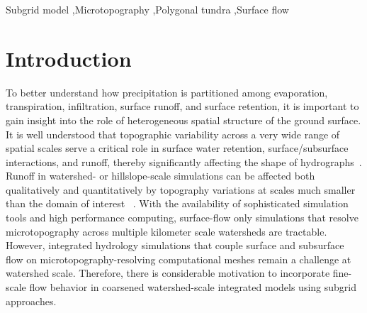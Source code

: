 \documentclass[review,11pt]{elsarticle}
\begin{document}
\begin{frontmatter}
\begin{keyword}
Subgrid model \sep Microtopography  \sep  Polygonal tundra \sep  Surface flow
\end{keyword}

\end{frontmatter}

\linenumbers

\FloatBarrier
\section{Introduction}\label{introduction}
To better understand how precipitation is partitioned among evaporation, transpiration, infiltration, surface runoff, and surface retention, it is important to gain insight into the role of heterogeneous spatial structure of the ground surface.
It is well understood that topographic variability across a very wide range of spatial scales serve a critical role in surface water retention, surface/subsurface interactions, and runoff, thereby significantly affecting the shape of hydrographs~\cite{toth1962theory,dunne1991effects,holden2005peatland, kvaerner2008generation, huang2009influences, andresen2015disappearing}.
Runoff in watershed- or hillslope-scale simulations can be affected both qualitatively and quantitatively by topography variations at scales much smaller than the domain of interest ~\cite{bronstert1997modelling,nakayama2006simulation}.
With the availability of sophisticated simulation tools and high performance computing, surface-flow only simulations that resolve microtopography across multiple kilometer scale watersheds are tractable.
However, integrated hydrology simulations that couple surface and subsurface flow on microtopography-resolving computational meshes remain a challenge at watershed scale.
Therefore, there is considerable motivation to incorporate fine-scale flow behavior in coarsened watershed-scale integrated models using subgrid approaches. 
\end{document}
